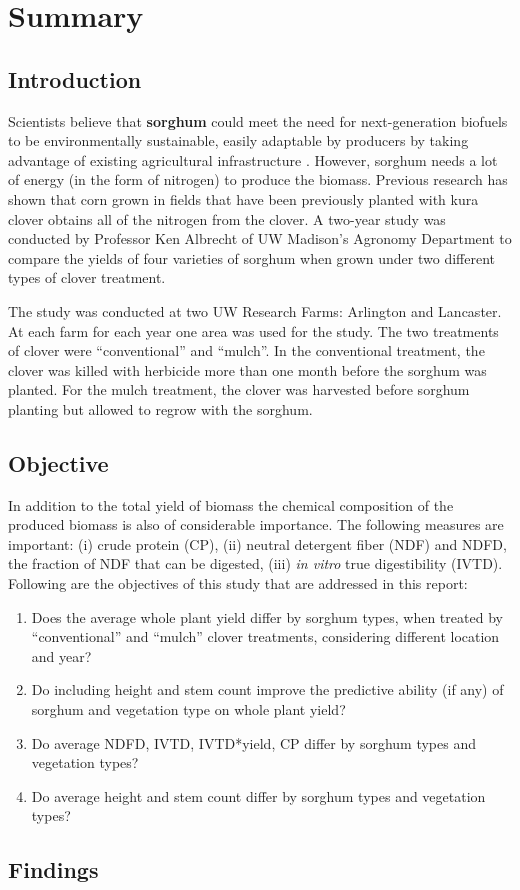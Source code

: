 \section*{Summary}\label{Sec_Summary}
\subsection*{Introduction}
Scientists believe that {\bf{sorghum}} could meet the need for next-generation biofuels to be environmentally sustainable, easily adaptable by producers by taking advantage of existing agricultural infrastructure \cite{Dweikat_etal_2012_BBB}. However, sorghum needs a lot of energy (in the form of nitrogen) to produce the biomass. Previous research has shown that corn grown in fields that have been previously planted with kura clover obtains all of the nitrogen from the clover. A two-year study was conducted by Professor Ken Albrecht of UW Madison's Agronomy Department to compare the yields of four varieties of sorghum when grown under two different types of clover treatment. 

The study was conducted at two UW Research Farms: Arlington and Lancaster. At each farm for each year one area was used for the study. The two treatments of clover were ``conventional'' and ``mulch''.  In the conventional treatment, the clover was killed with herbicide more than one month before the sorghum was planted. For the mulch treatment, the clover was harvested before sorghum planting but allowed to regrow with the sorghum. 

\subsection*{Objective}
In addition to the total yield of biomass the chemical composition of the produced biomass is also of considerable importance. The following measures are important: (i) crude protein (CP), (ii) neutral
detergent fiber (NDF) and NDFD, the fraction of NDF that can be digested, (iii) {\emph{in vitro}} true digestibility (IVTD). Following are the objectives of this study that are addressed in this report:
\begin{enumerate}
\item Does the average whole plant yield differ by sorghum types, when treated by ``conventional'' and ``mulch'' clover treatments, considering different location and year?
\item Do including height and stem count improve the predictive ability (if any) of sorghum and vegetation type on whole plant yield?
\item Do average NDFD, IVTD, IVTD*yield, CP differ by sorghum types and vegetation types?
\item Do average height and stem count differ by sorghum types and vegetation types?
\end{enumerate}

\subsection*{Findings}


